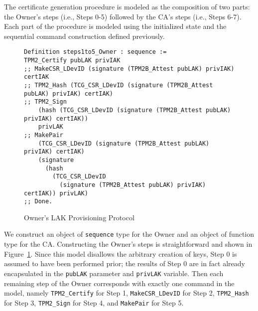 \documentclass[runningheads]{llncs}
\begin{document}



The certificate generation procedure is modeled as the composition of
two parts: the Owner's steps (i.e., Steps 0-5) followed by the CA's
steps (i.e., Steps 6-7).  Each part of the procedure is modeled using
the initialized state and the sequential command construction defined
previously.

\begin{figure}[hpbt]
\begin{lstlisting}[language=Coq]
Definition steps1to5_Owner : sequence :=
TPM2_Certify pubLAK privIAK
;; MakeCSR_LDevID (signature (TPM2B_Attest pubLAK) privIAK) certIAK
;; TPM2_Hash (TCG_CSR_LDevID (signature (TPM2B_Attest pubLAK) privIAK) certIAK)
;; TPM2_Sign 
    (hash (TCG_CSR_LDevID (signature (TPM2B_Attest pubLAK) privIAK) certIAK))
    privLAK
;; MakePair 
    (TCG_CSR_LDevID (signature (TPM2B_Attest pubLAK) privIAK) certIAK) 
    (signature
      (hash
        (TCG_CSR_LDevID
          (signature (TPM2B_Attest pubLAK) privIAK) certIAK)) privLAK)
;; Done. 
\end{lstlisting}
\caption{Owner's LAK Provisioning Protocol}
\label{fig:lak_model_Owner}
\end{figure}

We construct an object of \verb|sequence| type for the Owner and an
object of function type for the CA. Constructing the Owner's steps is
straightforward and shown in Figure~\ref{fig:lak_model_Owner}. Since
this model disallows the arbitrary creation of keys, Step 0 is assumed
to have been performed prior; the results of Step 0 are in fact
already encapsulated in the \verb|pubLAK| parameter and \verb|privLAK|
variable. Then each remaining step of the Owner corresponds with
exactly one command in the model, namely \verb|TPM2_Certify| for Step
1, \verb|MakeCSR_LDevID| for Step 2, \verb|TPM2_Hash| for Step 3,
\verb|TPM2_Sign| for Step 4, and \verb|MakePair| for Step 5.
\end{document}
